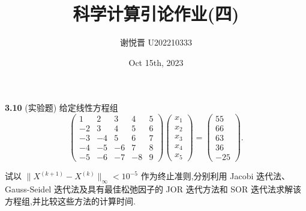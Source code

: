 \documentclass[a4paper,11pt,UTF8]{article}
\title{科学计算引论作业(四)}
\author{谢悦晋 \quad U202210333}
\date{Oct 15th, 2023 }
\begin{document}
\maketitle
\textbf{3.10} (实验题) 给定线性方程组
$$
	\begin{pmatrix}
		1&2&3&4&5\\
		-2&3&4&5&6\\
		-3&-4&5&6&7\\
		-4&-5&-6&7&8\\
		-5&-6&-7&-8&9
	\end{pmatrix}
	\begin{pmatrix}x_1\\x_2\\x_3\\x_4\\x_5\end{pmatrix}
	=\begin{pmatrix}55\\66\\63\\36\\-25\end{pmatrix}.
$$

试以 $\|X^{(k+1)}-X^{(k)}\|_\infty<10^{-5}$ 作为终止准则,分别利用 Jacobi 迭代法、Gauss-Seidel 迭代法及具有最佳松弛因子的 JOR 迭代方法和 SOR 迭代法求解该方程组,并比较这些方法的计算时间.
\end{document}
